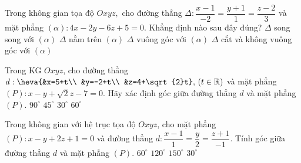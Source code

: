 	\begin{ex}%
	Trong không gian tọa độ $Oxyz,$ cho đường thẳng $\Delta\colon \dfrac{x-1}{-2}=\dfrac{y+1}1=\dfrac{z-2}{3}$ và mặt phẳng $(\alpha)\colon 4x-2y-6z+5=0.$ Khẳng định nào sau đây đúng?
	\choice
	{$\Delta$ song song với $(\alpha)$}
	{$\Delta$ nằm trên $(\alpha)$}
	{\True $\Delta$ vuông góc với $(\alpha)$}
	{$\Delta$ cắt và không vuông góc với $(\alpha)$}
	\end{ex}
	\begin{ex}%
	Trong KG $Oxyz$, cho đường thẳng $d: \heva{&x=5+t\\ &y=-2+t\\ &z=4+\sqrt{2}t},\, (t\in\mathbb{R})$ và mặt phẳng $(P): x-y+\sqrt{2}z-7=0$. Hãy xác định góc giữa đường thẳng $d$ và mặt phẳng $(P)$.
	\choice
	{$90^\circ$}
	{$45^\circ$}
	{\True $30^\circ$}
	{$60^\circ$}
	\end{ex}
	\begin{ex}%
	Trong không gian với hệ trục tọa độ $Oxyz$, cho mặt phẳng $(P) \colon x-y+2z+1=0$ và đường thẳng $d: \dfrac{x-1}{1}=\dfrac{y}{2}=\dfrac{z+1}{-1}$. Tính góc giữa đường thẳng $d$ và mặt phẳng $(P)$.
	\choice
	{$60^{\circ} $}
	{$120^{\circ} $}
	{$150^{\circ} $}
	{\True $30^{\circ} $}
	\end{ex}
